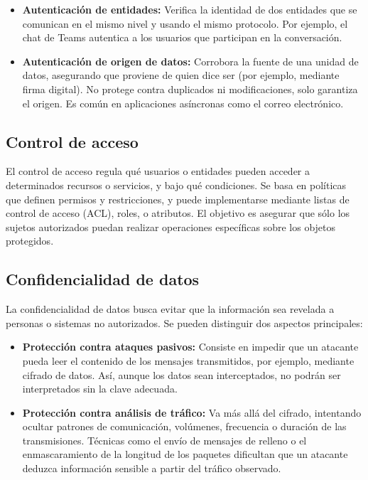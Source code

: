 \documentclass[11pt,a4paper]{article}
\begin{document}
    \begin{itemize}
        \item \textbf{Autenticación de entidades:} Verifica la identidad de dos entidades que se comunican en el mismo nivel y usando el mismo protocolo. Por ejemplo, el chat de Teams autentica a los usuarios que participan en la conversación.
        \item \textbf{Autenticación de origen de datos:} Corrobora la fuente de una unidad de datos, asegurando que proviene de quien dice ser (por ejemplo, mediante firma digital). No protege contra duplicados ni modificaciones, solo garantiza el origen. Es común en aplicaciones asíncronas como el correo electrónico.
    \end{itemize}

    \subsection{Control de acceso}
    El control de acceso regula qué usuarios o entidades pueden acceder a determinados recursos o servicios, y bajo qué condiciones. Se basa en políticas que definen permisos y restricciones, y puede implementarse mediante listas de control de acceso (ACL), roles, o atributos. El objetivo es asegurar que sólo los sujetos autorizados puedan realizar operaciones específicas sobre los objetos protegidos.

    \subsection{Confidencialidad de datos}
    La confidencialidad de datos busca evitar que la información sea revelada a personas o sistemas no autorizados. Se pueden distinguir dos aspectos principales:

    \begin{itemize}
        \item \textbf{Protección contra ataques pasivos:} Consiste en impedir que un atacante pueda leer el contenido de los mensajes transmitidos, por ejemplo, mediante cifrado de datos. Así, aunque los datos sean interceptados, no podrán ser interpretados sin la clave adecuada.
        \item \textbf{Protección contra análisis de tráfico:} Va más allá del cifrado, intentando ocultar patrones de comunicación, volúmenes, frecuencia o duración de las transmisiones. Técnicas como el envío de mensajes de relleno o el enmascaramiento de la longitud de los paquetes dificultan que un atacante deduzca información sensible a partir del tráfico observado.
    \end{itemize}
\end{document}
